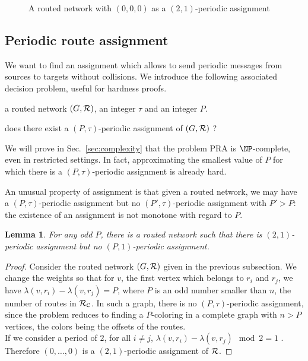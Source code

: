 \documentclass[a4paper,10pt]{article}
\newtheorem{lemma}[theorem]{Lemma}
\begin{document}
{\begin{figure}[ht]
\begin{center}
{\begin{tikzpicture}
\end{tikzpicture}

}
     \end{center}
       \caption{A routed network with $(0,0,0)$ as a $(2,1)$-periodic assignment}
       \label{fig:example}
      \end{figure}

      \subsection{Periodic route assignment}\label{nonmonotone}

    We want to find an assignment which allows to send periodic messages from sources to targets
    without collisions. We introduce the following associated decision problem, useful for hardness proofs.
    


       a routed network $(G,\cal R)$, an integer $\tau$ and an integer $P$.

       does there exist a $(P,\tau)$-periodic assignment of $(G,\cal R)$ ?


      We will prove in Sec.~\ref{sec:complexity} that the problem PRA is $\NP$-complete, even in restricted settings.
      In fact, approximating the smallest value of $P$ for which there is a $(P,\tau)$-periodic assignment is already hard.
      
      An unusual property of assignment is that given a routed network, we may have a $(P,\tau)$-periodic assignment but no
      $(P',\tau)$-periodic assignment with $P' > P$: the existence of an assignment is not monotone with regard to $P$.

	\begin{lemma} \label{lemma:monotonic}
	 For any odd $P$, there is a routed network such that there is $(2,1)$-periodic assignment but no $(P,1)$-periodic assignment.
	\end{lemma}
\begin{proof}

      Consider the routed network $(G,{\cal R})$ given in the previous subsection. 
      We change the weights so that for $v$, the first vertex which belongs to $r_i$ and $r_j$,
      we have $\lambda(v,r_i) - \lambda(v,r_j)= P$, where $P$ is an odd number smaller than $n$, the number of routes in ${\cal R_{\cal C}}$. In such a graph, there is no $(P,\tau)$-periodic assignment, since the problem reduces to finding a $P$-coloring in a complete graph with $n > P$ vertices, the colors being the offsets of the routes.\\
      If we consider a period of $2$, for all $i \neq j$, $\lambda(v,r_i) - \lambda(v,r_j) \mod 2 = 1$ . Therefore $(0,\dots,0)$ is a $(2,1)$-periodic assignment of ${\cal R}$.      
\end{proof}
      
}
\end{document}
